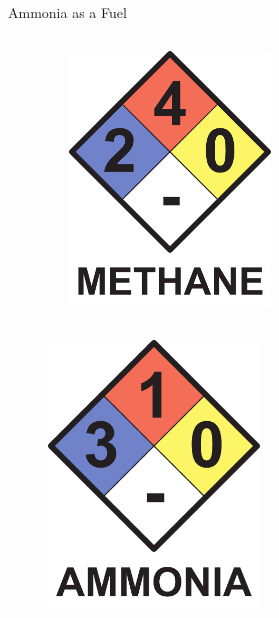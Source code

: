 \begin{frame}{Ammonia as a Fuel}
\begin{columns}[c, onlytextwidth]
\begin{column}{0.33\textwidth}
        \end{column}

        \begin{column}{0.33\textwidth}

            \begin{figure}[H]
                \centering
                \includegraphics[width=0.5\textwidth]{pdf/nfpa-methane.pdf}
            \end{figure}

        \end{column}

    \end{columns}

    \begin{columns}[c, onlytextwidth]

        \begin{column}{0.4\textwidth}

            \begin{figure}[H]
                \centering
                \includegraphics[width=0.5\textwidth]{pdf/nfpa-ammonia.pdf}
            \end{figure}


\end{column}
\end{columns}
\end{frame}

